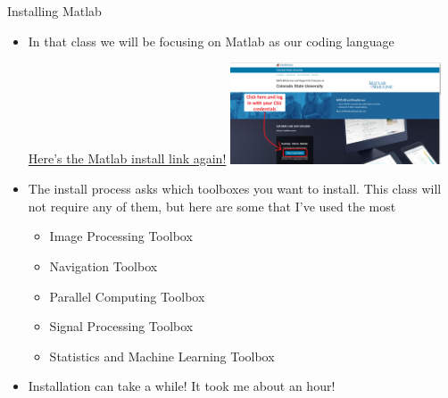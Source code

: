 {}\documentclass[letterpaper,
compress,
xcolor=x11names,
]{beamer}
\begin{document}
\begin{frame}{Installing Matlab}
	\footnotesize
	\begin{itemize}
		\item In that class we will be focusing on Matlab as our coding language \\
		\begin{center}		
			\textcolor{blue}{\href{https://www.mathworks.com/academia/tah-portal/colorado-state-university-40638290.html}{Here's the Matlab install link again!}}
			\includegraphics[height = 3cm]{MatlabInstallSite.png}
		\end{center}
		\item The install process asks which toolboxes you want to install. This class will not require any of them, but here are some that I've used the most
		\begin{itemize}
			\item Image Processing Toolbox
			\item Navigation Toolbox
			\item Parallel Computing Toolbox
			\item Signal Processing Toolbox
			\item Statistics and Machine Learning Toolbox
		\end{itemize}
		\item Installation can take a while! It took me about an hour!
	\end{itemize}
\end{frame}
\end{document}
